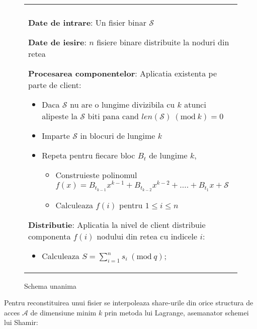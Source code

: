 \documentclass{llncs}
\newcommand{\Mod}[1]{\ (\text{mod}\ #1)}
\begin{document}
\begin{figure*}[h!]

\begin{tabular}{|p{\textwidth}|}
\hline

\\
\hspace{.1in}
\textbf{Date de intrare}: Un fisier binar $\mathcal{S}$
\medskip

\hspace{.1in}
\textbf{Date de iesire}: $n$ fisiere binare distribuite la noduri din retea
\medskip

\hspace{.1in}
\textbf{Procesarea componentelor}: Aplicatia existenta pe parte de client: 
	\begin{itemize}
		\item Daca $\mathcal{S}$ nu are o lungime divizibila cu $k$ atunci alipeste la $\mathcal{S}$ 
			biti pana cand $len(\mathcal{S}) \Mod k = 0$
		\item Imparte $\mathcal{S}$ in blocuri de lungime $k$
		\item Repeta pentru fiecare bloc $B_t$ de lungime $k$, 
		\begin{itemize}
			\item Construieste polinomul $f(x) = B_{t_{k - 1}}x ^ {k-1} + B_{t_{k - 2}}x ^ {k - 2} + .... + B_{t_1}x + \mathcal{S}$
			\item Calculeaza $f(i)$ pentru $1 \leq i \leq n$	
		\end{itemize}
	\end{itemize}

\hspace{.1in}
\textbf{Distributie}: Aplicatia la nivel de client distribuie componenta $f(i)$ nodului din retea cu indicele $i$:
	\begin{itemize}
		\item Calculeaza $S = \sum_{i=1}^{n} s_i \Mod q$;
	\end{itemize}

\\
\hline
\end{tabular}
\caption{Schema unanima \cite{Karnin:83}}
\label{fig:alouneh_distribution}
\end{figure*}





Pentru reconstituirea unui fisier se interpoleaza share-urile din orice structura de acces $\mathcal{A}$ de dimensiune minim $k$ prin metoda lui Lagrange, asemanator schemei lui Shamir:
\end{document}
